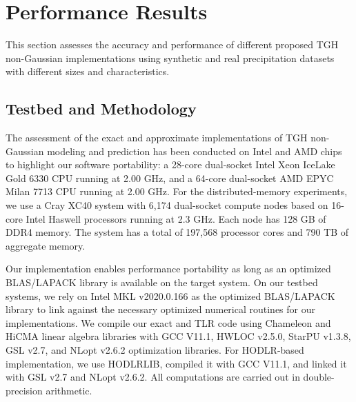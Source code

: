 \documentclass[conference]{IEEEtran}
\begin{document}
\section{Performance Results}
This section assesses the accuracy and performance of 
different proposed TGH non-Gaussian implementations
using synthetic and real precipitation datasets with different sizes and
characteristics. 





\subsection{Testbed and Methodology}
The assessment of the exact and approximate implementations of TGH non-Gaussian modeling and prediction has been conducted  on
Intel and AMD chips to highlight our software
portability: a 28-core dual-socket Intel Xeon IceLake
Gold 6330 CPU running at 2.00 GHz, and a 64-core dual-socket AMD EPYC Milan 7713 CPU running at 2.00 GHz. For the distributed-memory experiments, we use a Cray XC40
system with 6,174 dual-socket compute nodes based on 16-
core Intel Haswell processors running at 2.3 GHz. Each node
has 128 GB of DDR4 memory. The system has a total of
197,568 processor cores and 790 TB of aggregate memory.

Our implementation enables performance portability as long as an optimized BLAS/LAPACK library is available on the target system. On our testbed systems, we rely on Intel MKL v2020.0.166 as the optimized BLAS/LAPACK library to link against the necessary optimized numerical routines for our implementations. We compile our exact and TLR code using Chameleon and HiCMA linear algebra libraries with  GCC V11.1, HWLOC v2.5.0, StarPU v1.3.8,  GSL v2.7,
and NLopt v2.6.2 optimization libraries. For HODLR-based implementation, we use HODLRLIB, compiled it with GCC V11.1, and linked it with GSL v2.7 and NLopt v2.6.2. All computations are carried out in double-precision arithmetic.%
\end{document}

